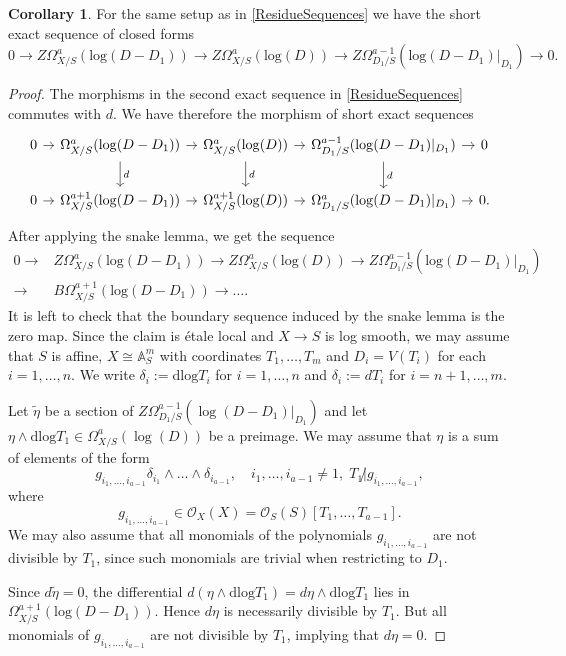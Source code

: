\documentclass{amsart}
\theoremstyle{definition}
\newtheorem{corollary}[theorem]{Corollary}
\newcommand\llog{\mathrm{log}}
\newcommand\dlog{\mathrm{dlog}}
\numberwithin{equation}{section}
\begin{document}
\begin{corollary}\label{ResidueSequenceClosedForms}
	For the same setup as in \cref{ResidueSequences} we have the short exact sequence of closed forms
	\[
	0\to Z\Omega_{X/S}^a(\llog(D-D_1))\to Z\Omega_{X/S}^a(\llog(D))\to Z\Omega^{a-1}_{D_1/S}(\llog(D-D_1)|_{D_1})\to 0.
	\]
\end{corollary}
\begin{proof}
	The morphisms in the second exact sequence in \cref{ResidueSequences} commutes with $d$. We have therefore the morphism of short exact sequences
	\[
	\begin{tikzcd}[column sep=1.84ex]
		0\ar[r]&\Omega^{a}_{X/S}(\llog(D-D_1))\ar[r]\ar[d,"d"]&\Omega^{a}_{X/S}(\llog(D))\ar[r]\ar[d,"d"]&\Omega^{a-1}_{D_1/S}(\llog(D-D_1)|_{D_1})\ar[r]\ar[d,"d"]&0\\
		0\ar[r]&\Omega^{a+1}_{X/S}(\llog(D-D_1))\ar[r]&\Omega^{a+1}_{X/S}(\llog(D))\ar[r]&\Omega^{a}_{D_1/S}(\llog(D-D_1)|_{D_1})\ar[r]&0.
	\end{tikzcd}
	\] 
	After applying the snake lemma, we get the sequence
	\[
	\begin{aligned}
	0\to& Z\Omega_{X/S}^a(\llog(D-D_1))\to Z\Omega_{X/S}^a(\llog(D))\to Z\Omega^{a-1}_{D_1/S}(\llog(D-D_1)|_{D_1})\\
	 \to &B\Omega^{a+1}_{X/S}(\llog(D-D_1))\to \dots.
	\end{aligned}
	\]
	It is left to check that the boundary sequence induced by the snake lemma is the zero map.  Since the claim is \'etale local and $X\to S$ is log smooth, we may assume that $S$ is affine, $X\cong \mathbb{A}^m_S$ with coordinates $T_1,\dots, T_m$ and $D_i=V(T_i)$ for each $i=1,\dots ,n$.
	We write $\delta_i:= \dlog   T_i$ for $i=1,\dots, n$ and $\delta_i:= dT_i$ for $i=n+1,\dots, m$.
	
	Let $\tilde\eta$ be a section of  $Z\Omega_{D_1/S}^{a-1}(\log(D-D_1)|_{D_1})$ and let $\eta\wedge \dlog   T_1\in \Omega^{a}_{X/S}(\log(D))$ be a preimage. We may assume that $\eta$ is a sum of elements of the form
	\[
	g_{i_1,\dots, i_{a-1}} \delta_{i_1}\wedge \dots \wedge \delta_{i_{a-1}}, \quad i_1,\dots,i_{a-1}\neq 1, \; T_1\not| g_{i_1,\dots,i_{a-1}},
	\]
	where 
	\[
	g_{i_1,\dots, i_{a-1}}\in \mathcal{O}_X(X) =\mathcal{O}_S(S)[T_1,\dots, T_{a-1}].
	\]
	We may also assume that all monomials of the polynomials $g_{i_1,\dots, i_{a-1}}$ are not divisible by $T_1$, since such monomials are trivial when restricting to $D_1$.
	 
	Since $d\tilde\eta=0$, the differential $d(\eta\wedge \dlog   T_1)=d\eta \wedge \dlog   T_1$ lies in $\Omega^{a+1}_{X/S}(\llog (D-D_1))$. Hence $d\eta$ is necessarily divisible by $T_1$. But all monomials of $g_{i_1,\dots, i_{a-1}}$ are not divisible by $T_1$, implying that $d\eta=0$. 
\end{proof}
\end{document}
